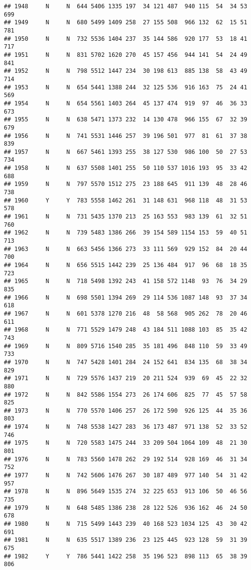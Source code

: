 \documentclass[]{article}
\begin{document}
\begin{verbatim}
## 1948     N     N  644 5406 1335 197  34 121 487  940 115  54  34 53  699
## 1949     N     N  680 5499 1409 258  27 155 508  966 132  62  15 51  781
## 1950     N     N  732 5536 1404 237  35 144 586  920 177  53  18 41  717
## 1951     N     N  831 5702 1620 270  45 157 456  944 141  54  24 49  841
## 1952     N     N  798 5512 1447 234  30 198 613  885 138  58  43 49  714
## 1953     N     N  654 5441 1388 244  32 125 536  916 163  75  24 41  569
## 1954     N     N  654 5561 1403 264  45 137 474  919  97  46  36 33  673
## 1955     N     N  638 5471 1373 232  14 130 478  966 155  67  32 39  679
## 1956     N     N  741 5531 1446 257  39 196 501  977  81  61  37 38  839
## 1957     N     N  667 5461 1393 255  38 127 530  986 100  50  27 53  734
## 1958     N     N  637 5508 1401 255  50 110 537 1016 193  95  33 42  688
## 1959     N     N  797 5570 1512 275  23 188 645  911 139  48  28 46  738
## 1960     Y     Y  783 5558 1462 261  31 148 631  968 118  48  31 53  578
## 1961     N     N  731 5435 1370 213  25 163 553  983 139  61  32 51  760
## 1962     N     N  739 5483 1386 266  39 154 589 1154 153  59  40 51  713
## 1963     N     N  663 5456 1366 273  33 111 569  929 152  84  20 44  700
## 1964     N     N  656 5515 1442 239  25 136 484  917  96  68  18 35  723
## 1965     N     N  718 5498 1392 243  41 158 572 1148  93  76  34 29  835
## 1966     N     N  698 5501 1394 269  29 114 536 1087 148  93  37 34  618
## 1967     N     N  601 5378 1270 216  48  58 568  905 262  78  20 46  611
## 1968     N     N  771 5529 1479 248  43 184 511 1088 103  85  35 42  743
## 1969     N     N  809 5716 1540 285  35 181 496  848 110  59  33 49  733
## 1970     N     N  747 5428 1401 284  24 152 641  834 135  68  38 34  829
## 1971     N     N  729 5576 1437 219  20 211 524  939  69  45  22 32  880
## 1972     N     N  842 5586 1554 273  26 174 606  825  77  45  57 58  825
## 1973     N     N  770 5570 1406 257  26 172 590  926 125  44  35 36  803
## 1974     N     N  748 5538 1427 283  36 173 487  971 138  52  33 52  746
## 1975     N     N  720 5583 1475 244  33 209 504 1064 109  48  21 30  801
## 1976     N     N  783 5560 1478 262  29 192 514  928 169  46  31 34  752
## 1977     N     N  742 5606 1476 267  30 187 489  977 140  54  31 42  957
## 1978     N     N  896 5649 1535 274  32 225 653  913 106  50  46 56  735
## 1979     N     N  648 5485 1386 238  28 122 526  936 162  46  24 50  678
## 1980     N     N  715 5499 1443 239  40 168 523 1034 125  43  30 42  691
## 1981     N     N  635 5517 1389 236  23 125 445  923 128  59  31 39  675
## 1982     Y     Y  786 5441 1422 258  35 196 523  898 113  65  38 39  806

\end{verbatim}
\end{document}
